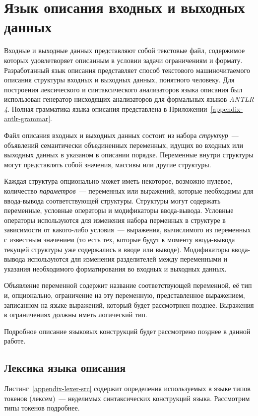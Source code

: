 \documentclass[times,specification,annotation]{style/itmo-student-thesis/itmo-student-thesis}
\begin{document}
\section{Язык описания входных и выходных данных}

Входные и выходные данных представляют собой текстовые файл, содержимое которых удовлетворяет описанным в условии задачи ограничениям и формату. Разработанный язык описания представляет способ текстового машиночитаемого описания структуры входных и выходных данных, понятного человеку. Для построения лексического и синтаксического анализаторов языка описания был использован генератор нисходящих анализаторов для формальных языков \textit{ANTLR 4}. Полная грамматика языка описания представлена в Приложении~\ref{appendix-antlr-grammar}.

Файл описания входных и выходных данных состоит из набора \textit{структур}~--- объявлений семантически объединенных переменных, идущих во входных или выходных данных в указаном в описании порядке. Переменные внутри структуры могут представлять собой значения, массивы или другие структуры.

Каждая структура опционально может иметь некоторое, возможно нулевое, количество \textit{параметров}~--- переменных или выражений, которые необходимы для ввода-вывода соответствующей структуры. Структуры могут содержать переменные, условные операторы и модификаторы ввода-вывода. Условные операторы используются для изменения набора перменных в структуре в зависимости от какого-либо условия~--- выражения, вычислимого из переменных с известным значением (то есть тех, которые будут к моменту ввода-вывода текущей структуры уже содержались в вводе или выводе). Модификаторы ввода-вывода используются для изменения разделителей между переменными и указания необходимого форматирования во входных и выходных данных.

Объявление переменной содержит название соответствующей переменной, её тип и, опционально, ограничение на эту переменную, представленное выражением, записанном на языке выражений, который будет рассмотрнен позднее. Выражения в ограничениях должны иметь логический тип.

Подробное описание языковых конструкций будет рассмотрено позднее в данной работе.

\subsection{Лексика языка описания}

Листинг~\ref{appendix-lexer-src} содержит определения используемых в языке типов токенов (лексем)~--- неделимых синтаксических конструкций языка. Рассмотрим типы токенов подробнее.
\end{document}
